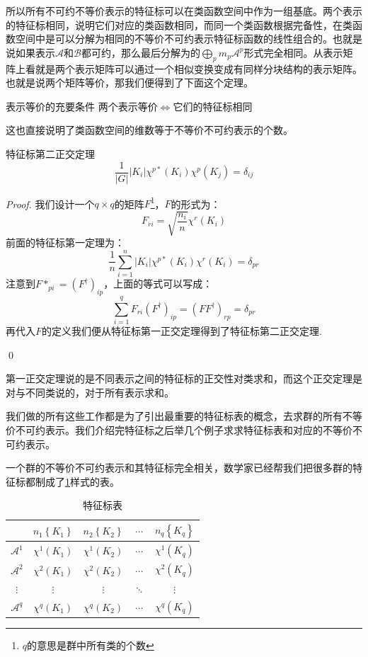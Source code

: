 所以所有不可约不等价表示的特征标可以在类函数空间中作为一组基底。两个表示的特征标相同，说明它们对应的类函数相同，而同一个类函数根据完备性，在类函数空间中是可以分解为相同的不等价不可约表示特征标函数的线性组合的。也就是说如果表示$\mathscr{A}$和$\mathscr{B}$都可约，那么最后分解为的$\bigoplus_p m_p\mathscr{A}^p$形式完全相同。从表示矩阵上看就是两个表示矩阵可以通过一个相似变换变成有同样分块结构的表示矩阵。也就是说两个矩阵等价，那我们便得到了下面这个定理。
\begin{theorem}{表示等价的充要条件}
	两个表示等价$\iff$它们的特征标相同
\end{theorem}
这也直接说明了类函数空间的维数等于不等价不可约表示的个数。
\begin{theorem}{特征标第二正交定理}
	\begin{equation}
		\frac{1}{|G|}|K_i|\chi^{p*}(K_i)\chi^{p}(K_j)=\delta_{ij}
	\end{equation}
\end{theorem}
\begin{proof}
	我们设计一个$q\times q$的矩阵$F$\footnote{$q$的意思是群中所有类的个数}，$F$的形式为：
	\[F_{ri}=\sqrt{\frac{n_i}{n}}\chi^r(K_i)\]
	前面的特征标第一定理为：
	\[\frac{1}{n}\sum_{i=1}^n|K_i|\chi^{p*}(K_i)\chi^r(K_i)=\delta_{pr}\]
	注意到$F*_{pi}=(F^\dagger)_{ip}$，上面的等式可以写成：
	\[\sum_{i=1}^q F_{ri}(F^\dagger)_{ip}=(FF^\dagger)_{rp}=\delta_{pr}\]
	再代入$F$的定义我们便从特征标第一正交定理得到了特征标第二正交定理.
	
	\qed
\end{proof}

第一正交定理说的是不同表示之间的特征标的正交性对类求和，而这个正交定理是对与不同类说的，对于所有表示求和。

我们做的所有这些工作都是为了引出最重要的特征标表的概念，去求群的所有不等价不可约表示。我们介绍完特征标之后举几个例子求求特征标表和对应的不等价不可约表示。

一个群的不等价不可约表示和其特征标完全相关，数学家已经帮我们把很多群的特征标都制成了\ref{tab:D.2}样式的表。
\begin{table}[h]
	\centering
	\caption{特征标表}
	\label{tab:D.2}
	\begin{tabular}{c|c|c|c|c} 
		\hline
		& $n_1\left\{K_1\right\}$ & $n_2\left\{K_2\right\}$ & $\cdots$ & $n_q\left\{K_q\right\}$ \\
		\hline$\mathscr{A}^1$ & $\chi^1\left(K_1\right)$ & $\chi^1\left(K_2\right)$ & $\cdots$ & $\chi^1\left(K_q\right)$ \\
		\hline$\mathscr{A}^2$ & $\chi^2\left(K_1\right)$ & $\chi^2\left(K_2\right)$ & $\cdots$ & $\chi^2\left(K_q\right)$ \\
		\hline$\vdots$ & $\vdots$ & $\vdots$ & $\ddots$ & $\vdots$ \\
		\hline$\mathscr{A}^q$ & $\chi^q\left(K_1\right)$ & $\chi^q\left(K_2\right)$ & $\cdots$ & $\chi^q\left(K_q\right)$ \\
		\hline
	\end{tabular}
\end{table}

